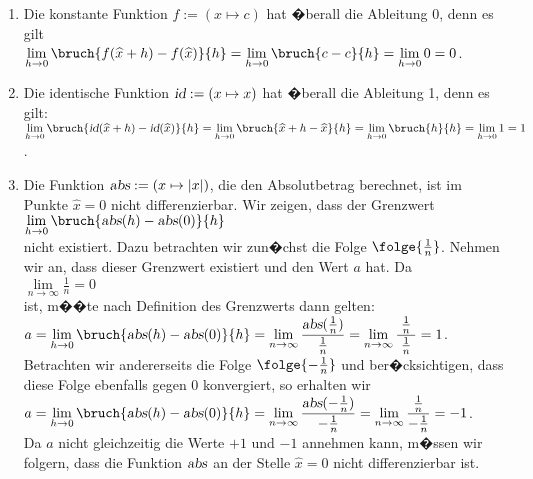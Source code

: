 \examples
\begin{enumerate}
\item Die konstante Funktion $f := (x \mapsto c)$ hat �berall die Ableitung
      $0$, denn es gilt \\[0.3cm]
      \hspace*{1.3cm}$\lim\limits_{h \rightarrow 0} \bruch{f(\widehat{x} + h) - f(\widehat{x})}{h} =
\lim\limits_{h \rightarrow 0} \bruch{c - c}{h} = \lim\limits_{h \rightarrow 0} 0 = 0$.
\item Die identische Funktion $\textsl{id} := (x \mapsto x)$ hat �berall die Ableitung 1,
      denn es gilt: 
      \\[0.3cm]
      \hspace*{1.3cm}
      $\lim\limits_{h \rightarrow 0} \bruch{\textsl{id}(\widehat{x} + h) - \textsl{id}(\widehat{x})}{h} =
       \lim\limits_{h \rightarrow 0} \bruch{\widehat{x} + h - \widehat{x}}{h} =
       \lim\limits_{h \rightarrow 0} \bruch{h}{h} = \lim\limits_{h \rightarrow 0} 1 = 1$.
\item Die Funktion $\textsl{abs} := ( x \mapsto |x|)$, die den Absolutbetrag berechnet, ist im
      Punkte $\widehat{x} = 0$ nicht differenzierbar.  Wir zeigen, dass der Grenzwert
      \\[0.3cm]
      \hspace*{1.3cm}
            $\lim\limits_{h \rightarrow 0} \bruch{\textsl{abs}(h) - \textsl{abs}(0)}{h}$
      \\[0.3cm]
      nicht existiert.  Dazu betrachten wir zun�chst die Folge $\folge{\frac{1}{n}}$.
      Nehmen wir an, dass dieser Grenzwert existiert und den Wert $a$ hat.  
      Da \\[0.3cm]
      \hspace*{1.3cm}
      $\lim\limits_{n\rightarrow\infty} \frac{1}{n} = 0$ 
      \\[0.3cm]
      ist, m��te nach Definition des Grenzwerts dann gelten: \\[0.3cm]
      \hspace*{1.3cm}
      $a = \displaystyle \lim\limits_{h \rightarrow 0} \bruch{\textsl{abs}(h) - \textsl{abs}(0)}{h} = 
       \lim\limits_{n\rightarrow\infty} \frac{\textsl{abs}(\frac{1}{n})}{\frac{1}{n}} = 
       \lim\limits_{n\rightarrow\infty} \frac{\;\frac{1}{n}\;}{\frac{1}{n}} = 1 $.
      \\[0.3cm]
      Betrachten wir andererseits die Folge $\folge{-\frac{1}{n}}$ und ber�cksichtigen,
      dass diese Folge ebenfalls gegen 0 konvergiert, so erhalten wir
      \\[0.3cm]
      \hspace*{1.3cm}
      $a = \displaystyle \lim\limits_{h \rightarrow 0} \bruch{\textsl{abs}(h) - \textsl{abs}(0)}{h} = 
       \lim\limits_{n\rightarrow\infty} \frac{\textsl{abs}(-\frac{1}{n})}{-\frac{1}{n}} = 
       \lim\limits_{n\rightarrow\infty} \frac{\;\frac{1}{n}\;}{-\frac{1}{n}} = -1$.
      \\[0.3cm]
      Da $a$ nicht gleichzeitig die Werte $+1$ und $-1$ annehmen kann, m�ssen wir folgern,
      dass die Funktion $\textsl{abs}$ an der Stelle $\widehat{x} = 0$ nicht
      differenzierbar ist.  \eox
\end{enumerate}


